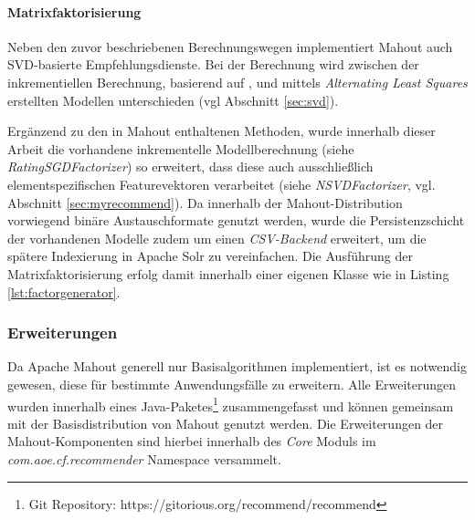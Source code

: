 

\paragraph{Matrixfaktorisierung} Neben den zuvor beschriebenen Berechnungswegen implementiert Mahout auch \acs{SVD}-basierte Empfehlungsdienste. Bei der Berechnung wird zwischen der inkrementiellen Berechnung, basierend auf \citep{funk2006}, und mittels \textit{Alternating Least Squares} \citep{Bell:2007:SCF:1441428.1442050,zhou08} erstellten Modellen unterschieden (vgl Abschnitt \ref{sec:svd}).

Ergänzend zu den in Mahout enthaltenen Methoden, wurde innerhalb dieser Arbeit die vorhandene inkrementelle Modellberechnung (siehe \textit{RatingSGDFactorizer}) so erweitert, dass diese auch ausschließlich elementspezifischen Featurevektoren verarbeitet (siehe \textit{NSVDFactorizer}, vgl. Abschnitt \ref{sec:myrecommend}). Da innerhalb der Mahout-Distribution vorwiegend binäre Austauschformate genutzt werden, wurde die Persistenzschicht der vorhandenen Modelle zudem um einen \textit{CSV-Backend} erweitert, um die spätere Indexierung in Apache Solr zu vereinfachen. Die Ausführung der Matrixfaktorisierung erfolg damit innerhalb einer eigenen Klasse wie in Listing \ref{lst:factorgenerator}.



\subsubsection{Erweiterungen}\label{sec:mahoutext}

Da Apache Mahout generell nur Basisalgorithmen implementiert, ist es notwendig gewesen, diese für bestimmte Anwendungsfälle zu erweitern. Alle Erweiterungen wurden innerhalb eines Java-Paketes\footnote{Git Repository: https://gitorious.org/recommend/recommend } zusammengefasst und können gemeinsam mit der Basisdistribution von Mahout genutzt werden. Die Erweiterungen der Mahout-Komponenten sind hierbei innerhalb des \textit{Core} Moduls im \textit{com.aoe.cf.recommender} Namespace versammelt.

